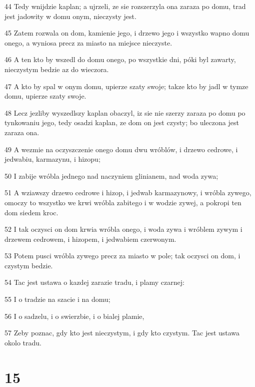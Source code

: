 \par 44 Tedy wnijdzie kaplan; a ujrzeli, ze sie rozszerzyla ona zaraza po domu, trad jest jadowity w domu onym, nieczysty jest.
\par 45 Zatem rozwala on dom, kamienie jego, i drzewo jego i wszystko wapno domu onego, a wyniosa precz za miasto na miejsce nieczyste.
\par 46 A ten kto by wszedl do domu onego, po wszystkie dni, póki byl zawarty, nieczystym bedzie az do wieczora.
\par 47 A kto by spal w onym domu, upierze szaty swoje; takze kto by jadl w tymze domu, upierze szaty swoje.
\par 48 Lecz jezliby wyszedlszy kaplan obaczyl, iz sie nie szerzy zaraza po domu po tynkowaniu jego, tedy osadzi kaplan, ze dom on jest czysty; bo uleczona jest zaraza ona.
\par 49 A wezmie na oczyszczenie onego domu dwu wróblów, i drzewo cedrowe, i jedwabiu, karmazynu, i hizopu;
\par 50 I zabije wróbla jednego nad naczyniem glinianem, nad woda zywa;
\par 51 A wziawszy drzewo cedrowe i hizop, i jedwab karmazynowy, i wróbla zywego, omoczy to wszystko we krwi wróbla zabitego i w wodzie zywej, a pokropi ten dom siedem kroc.
\par 52 I tak oczysci on dom krwia wróbla onego, i woda zywa i wróblem zywym i drzewem cedrowem, i hizopem, i jedwabiem czerwonym.
\par 53 Potem pusci wróbla zywego precz za miasto w pole; tak oczysci on dom, i czystym bedzie.
\par 54 Tac jest ustawa o kazdej zarazie tradu, i plamy czarnej:
\par 55 I o tradzie na szacie i na domu;
\par 56 I o sadzelu, i o swierzbie, i o bialej plamie,
\par 57 Zeby poznac, gdy kto jest nieczystym, i gdy kto czystym. Tac jest ustawa okolo tradu.

\chapter{15}

